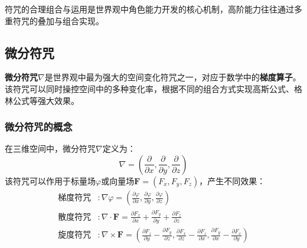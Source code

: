 \documentclass[lang=cn,newtx,10pt,scheme=chinese]{elegantbook}
\newcommand{\md}{\mathrm{d}}
\begin{document}

符咒的合理组合与运用是世界观中角色能力开发的核心机制，高阶能力往往通过多重符咒的叠加与组合实现。

\subsection{微分符咒}

\textbf{微分符咒$\nabla$}是世界观中最为强大的空间变化符咒之一，对应于数学中的\textbf{梯度算子}。该符咒可以同时操控空间中的多种变化率，根据不同的组合方式实现高斯公式、格林公式等强大效果。

\subsubsection{微分符咒的概念}

\begin{definition}[微分符咒]
    在三维空间中，微分符咒$\nabla$定义为：
    \[
        \nabla = \left(\frac{\partial}{\partial x}, \frac{\partial}{\partial y}, \frac{\partial}{\partial z}\right)
    \]
    该符咒可以作用于标量场$\varphi$或向量场$\bm{F}=(F_x,F_y,F_z)$，产生不同效果：
    \begin{align*}
        \text{梯度符咒} & : \nabla\varphi = \left(\frac{\partial\varphi}{\partial x}, \frac{\partial\varphi}{\partial y}, \frac{\partial\varphi}{\partial z}\right)                                                                                                   \\
        \text{散度符咒} & : \nabla\cdot\bm{F} = \frac{\partial F_x}{\partial x} + \frac{\partial F_y}{\partial y} + \frac{\partial F_z}{\partial z}                                                                                                                   \\
        \text{旋度符咒} & : \nabla\times\bm{F} = \left(\frac{\partial F_z}{\partial y} - \frac{\partial F_y}{\partial z}, \frac{\partial F_x}{\partial z} - \frac{\partial F_z}{\partial x}, \frac{\partial F_y}{\partial x} - \frac{\partial F_x}{\partial y}\right)
    \end{align*}
\end{definition}
\end{document}
